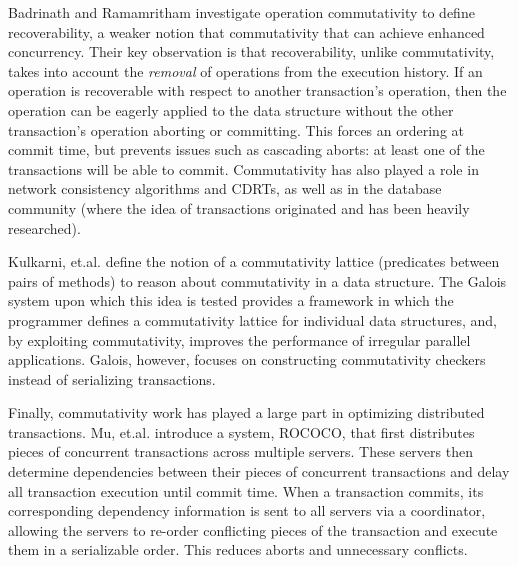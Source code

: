 Badrinath and Ramamritham\cite{badrinath} investigate operation commutativity to define recoverability, a weaker notion that commutativity that can achieve enhanced concurrency. Their key observation is that recoverability, unlike commutativity, takes into account the \emph{removal} of operations from the execution history. If an operation is recoverable with respect to another transaction's operation, then the operation can be eagerly applied to the data structure without the other transaction's operation aborting or committing. This forces an ordering at commit time, but prevents issues such as cascading aborts: at least one of the transactions will be able to commit. Commutativity has also played a role in network consistency algorithms and CDRTs\cite{CRDT}, as well as in the database community (where the idea of transactions originated and has been heavily researched).

Kulkarni, et.al.\cite{galois} define the notion of a commutativity lattice (predicates between pairs of methods) to reason about commutativity in a data structure. The Galois system upon which this idea is tested provides a framework in which the programmer defines a commutativity lattice for individual data structures, and, by exploiting commutativity, improves the performance of irregular parallel applications. Galois, however, focuses on constructing commutativity checkers instead of serializing transactions.

Finally, commutativity work has played a large part in optimizing distributed transactions. Mu, et.al.\cite{distributed} introduce a system, ROCOCO, that first distributes pieces of concurrent transactions across multiple servers. These servers then determine dependencies between their pieces of concurrent transactions and delay all transaction execution until commit time. When a transaction commits, its corresponding dependency information is sent to all servers via a coordinator, allowing the servers to re-order conflicting pieces of the transaction and execute them in a serializable order. This reduces aborts and unnecessary conflicts.
